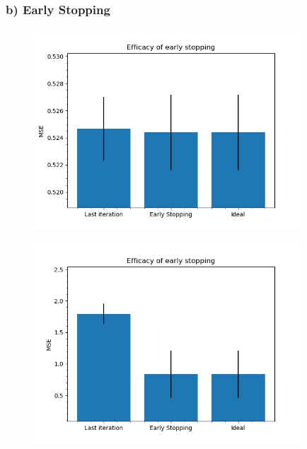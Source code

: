 \subsubsection*{b) Early Stopping}
\begin{figure}[!htbp]
	\centering
        \includegraphics[width=10cm]{1_2_b}
	\caption{}
\end{figure}

\begin{figure}[!htbp]
	\centering
        \includegraphics[width=10cm]{1_2_b2}
	\caption{}
\end{figure}

